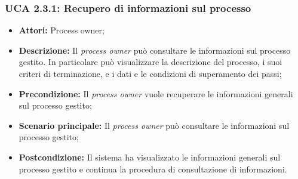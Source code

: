 \hypertarget{A2.3.1}{}
\subsubsection{UCA 2.3.1: Recupero di informazioni sul processo}
\begin{itemize}
\item \textbf{Attori:} Process owner;
\item \textbf{Descrizione:}
Il \textit{process owner} può consultare le informazioni sul processo gestito. In particolare può visualizzare la descrizione del processo, i suoi criteri di terminazione, e i dati e le condizioni di superamento dei passi;
\item \textbf{Precondizione:}
Il \textit{process owner} vuole recuperare le informazioni generali sul processo gestito;
\item \textbf{Scenario principale:}
Il \textit{process owner} può consultare le informazioni sul processo gestito;
\item \textbf{Postcondizione:}
Il sistema ha visualizzato le informazioni generali sul processo gestito e continua la procedura di consultazione di informazioni.
\end{itemize}

\hypertarget{A2.3.2}{}
